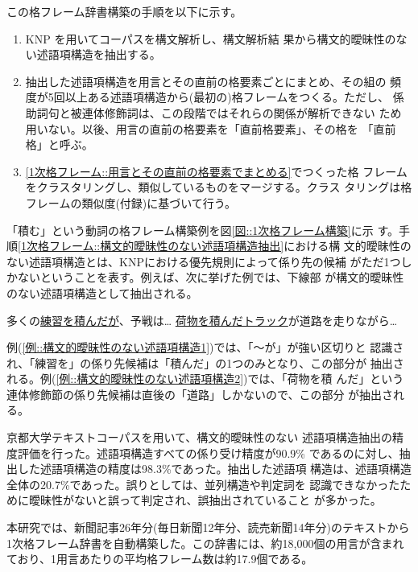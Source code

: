 \documentclass[fleqn]{nlp}
\begin{document}
この格フレーム辞書構築の手順を以下に示す。
\begin{enumerate}
 \item KNP \cite{Kurohashi1994}を用いてコーパスを構文解析し、構文解析結
       果から構文的曖昧性のない述語項構造を抽出する。\label{1次格フレー
       ム::構文的曖昧性のない述語項構造抽出}
 \item 抽出した述語項構造を用言とその直前の格要素ごとにまとめ、その組の
       頻度が5回以上ある述語項構造から(最初の)格フレームをつくる。ただし、
       係助詞句と被連体修飾詞は、この段階ではそれらの関係が解析できない
       ため用いない。以後、用言の直前の格要素を「直前格要素」、その格を
       「直前格」と呼ぶ。\label{1次格フレーム::用言とその直前の格要素で
       まとめる}
 \item \ref{1次格フレーム::用言とその直前の格要素でまとめる}でつくった格
       フレームをクラスタリングし、類似しているものをマージする。クラス
       タリングは格フレームの類似度(付録)に基づいて行う。
\end{enumerate}
「積む」という動詞の格フレーム構築例を図\ref{図::1次格フレーム構築}に示
す。手順\ref{1次格フレーム::構文的曖昧性のない述語項構造抽出}における構
文的曖昧性のない述語項構造とは、KNPにおける優先規則によって係り先の候補
がただ1つしかないということを表す。例えば、次に挙げた例では、下線部
が構文的曖昧性のない述語項構造として抽出される。
\begin{exe}
 \ex
 \begin{xlist}
  \ex \label{例::構文的曖昧性のない述語項構造1} 多くの\underline{練習を積んだが}、予戦は…
  \ex \label{例::構文的曖昧性のない述語項構造2} \underline{荷物を積んだトラック}が道路を走りながら…
 \end{xlist}
\end{exe}
例(\ref{例::構文的曖昧性のない述語項構造1})では、「〜が」が強い区切りと
認識され、「練習を」の係り先候補は「積んだ」の1つのみとなり、この部分が
抽出される。例(\ref{例::構文的曖昧性のない述語項構造2})では、「荷物を積
んだ」という連体修飾節の係り先候補は直後の「道路」しかないので、この部分
が抽出される。

京都大学テキストコーパス\cite{Kurohashi1998}を用いて、構文的曖昧性のない
述語項構造抽出の精度評価を行った。述語項構造すべての係り受け精度が90.9\% 
であるのに対し、抽出した述語項構造の精度は98.3\%であった。抽出した述語項
構造は、述語項構造全体の20.7\%であった。誤りとしては、並列構造や判定詞を
認識できなかったために曖昧性がないと誤って判定され、誤抽出されていること
が多かった。

本研究では、新聞記事26年分(毎日新聞12年分、読売新聞14年分)のテキストから
1次格フレーム辞書を自動構築した。この辞書には、約18,000個の用言が含まれ
ており、1用言あたりの平均格フレーム数は約17.9個である。
\end{document}
